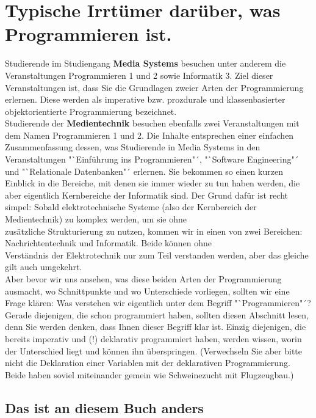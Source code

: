 \chapter[Das ist Programmieren (wirklich)]{Typische Irrtümer darüber, was Programmieren ist.}

Studierende im Studiengang \textbf{Media Systems} besuchen unter anderem die Veranstaltungen Programmieren 1 und 2 sowie Informatik 3. Ziel dieser Veranstaltungen ist, dass Sie die Grundlagen zweier Arten der Programmierung erlernen. Diese werden als imperative bzw. prozdurale und klassenbasierter objektorientierte Programmierung bezeichnet.\\

Studierende der \textbf{Medientechnik} besuchen ebenfalls zwei Veranstaltungen mit dem Namen Programmieren 1 und 2. Die Inhalte entsprechen einer einfachen Zusammenfassung dessen, was Studierende in Media Systems in den Veranstaltungen "`Einführung ins Programmieren"´, "`Software Engineering"´ und "`Relationale Datenbanken"´ erlernen. Sie bekommen so einen kurzen Einblick in die Bereiche, mit denen sie immer wieder zu tun haben werden, die aber eigentlich Kernbereiche der Informatik sind. Der Grund dafür ist recht simpel: Sobald elektrotechnische Systeme (also der Kernbereich der Medientechnik) zu komplex werden, um sie ohne\\
zusätzliche Strukturierung zu nutzen, kommen wir in einen von zwei Bereichen: Nachrichtentechnik und Informatik. Beide können ohne\\
Verständnis der Elektrotechnik nur zum Teil verstanden werden, aber das gleiche gilt auch umgekehrt.\\

Aber bevor wir uns ansehen, was diese beiden Arten der Programmierung ausmacht, wo Schnittpunkte und wo Unterschiede vorliegen, sollten wir eine Frage klären: Was verstehen wir eigentlich unter dem Begriff "`Programmieren"´? Gerade diejenigen, die schon programmiert haben, sollten diesen Abschnitt lesen, denn Sie werden denken, dass Ihnen dieser Begriff klar ist. Einzig diejenigen, die bereits imperativ und (!) deklarativ programmiert haben, werden wissen, worin der Unterschied liegt und können ihn überspringen. (Verwechseln Sie aber bitte nicht die Deklaration einer Variablen mit der deklarativen Programmierung. Beide haben soviel miteinander gemein wie Schweinezucht mit Flugzeugbau.)

\section{Das ist an diesem Buch anders}

